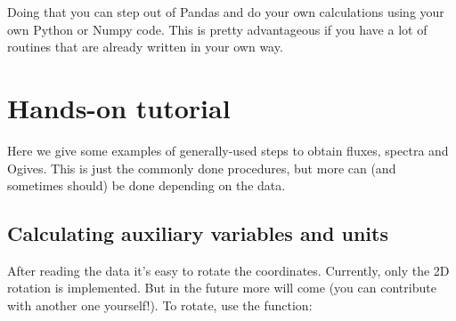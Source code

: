\documentclass[a4paper,10pt,oneside]{sphinxmanual}
\begin{document}
Doing that you can step out of Pandas and do your own calculations using your
own Python or Numpy code. This is pretty advantageous if you have a lot of routines
that are already written in your own way.


\chapter{Hands-on tutorial}
\label{tutorial::doc}\label{tutorial:hands-on-tutorial}
Here we give some examples of generally-used steps to obtain fluxes, spectra
and Ogives. This is just the commonly done procedures, but more can (and
sometimes should) be done depending on the data.


\section{Calculating auxiliary variables and units}
\label{tutorial:calculating-auxiliary-variables-and-units}
After reading the data it's easy to rotate the coordinates. Currently, only the
2D rotation is implemented. But in the future more will come (you can
contribute with another one yourself!).  To rotate, use the 
function:
\end{document}
